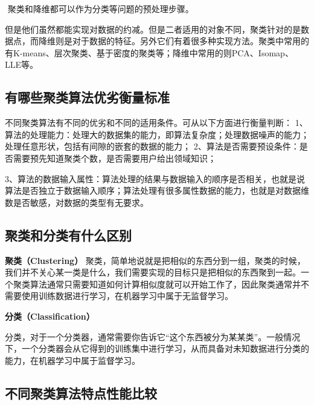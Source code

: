 ​ 聚类和降维都可以作为分类等问题的预处理步骤。

 

​
但是他们虽然都能实现对数据的约减。但是二者适用的对象不同，聚类针对的是数据点，而降维则是对于数据的特征。另外它们有着很多种实现方法。聚类中常用的有K-means、层次聚类、基于密度的聚类等；降维中常用的则PCA、Isomap、LLE等。

\subsection{有哪些聚类算法优劣衡量标准}\label{ux6709ux54eaux4e9bux805aux7c7bux7b97ux6cd5ux4f18ux52a3ux8861ux91cfux6807ux51c6}

不同聚类算法有不同的优劣和不同的适用条件。可从以下方面进行衡量判断：
1、算法的处理能力：处理大的数据集的能力，即算法复杂度；处理数据噪声的能力；处理任意形状，包括有间隙的嵌套的数据的能力；
2、算法是否需要预设条件：是否需要预先知道聚类个数，是否需要用户给出领域知识；

​
3、算法的数据输入属性：算法处理的结果与数据输入的顺序是否相关，也就是说算法是否独立于数据输入顺序；算法处理有很多属性数据的能力，也就是对数据维数是否敏感，对数据的类型有无要求。

\subsection{聚类和分类有什么区别}\label{ux805aux7c7bux548cux5206ux7c7bux6709ux4ec0ux4e48ux533aux522b}

\textbf{聚类（Clustering） }
聚类，简单地说就是把相似的东西分到一组，聚类的时候，我们并不关心某一类是什么，我们需要实现的目标只是把相似的东西聚到一起。一个聚类算法通常只需要知道如何计算相似度就可以开始工作了，因此聚类通常并不需要使用训练数据进行学习，在机器学习中属于无监督学习。

\textbf{分类（Classification） }

​
分类，对于一个分类器，通常需要你告诉它``这个东西被分为某某类''。一般情况下，一个分类器会从它得到的训练集中进行学习，从而具备对未知数据进行分类的能力，在机器学习中属于监督学习。

\subsection{不同聚类算法特点性能比较}\label{ux4e0dux540cux805aux7c7bux7b97ux6cd5ux7279ux70b9ux6027ux80fdux6bd4ux8f83}

